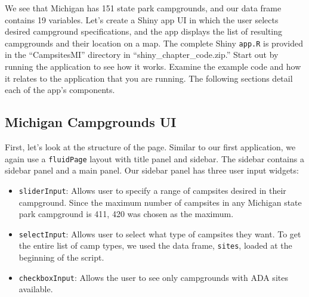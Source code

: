 \documentclass[12pt,oneside]{book}\usepackage[]{graphicx}\usepackage[]{color}
\begin{document}
We see that Michigan has 151 state park campgrounds, and our data frame contains 19 variables. Let's create a Shiny app UI in which the user selects desired campground specifications, and the app displays the list of resulting campgrounds and their location on a map. The complete Shiny \verb+app.R+ is provided in the ``CampsitesMI'' directory in ``shiny\_chapter\_code.zip.'' Start out by running the application to see how it works. Examine the example code and how it relates to the application that you are running. The following sections detail each of the app's components.

\subsection{Michigan Campgrounds UI}

First, let's look at the structure of the page. Similar to our first application, we again use a \verb+fluidPage+ layout with title panel and sidebar. The sidebar contains a sidebar panel and a main panel. Our sidebar panel has three user input widgets:
\begin{itemize}
\item \verb+sliderInput+: Allows user to specify a range of campsites desired in their campground. Since the maximum number of campsites in any Michigan state park campground is 411, 420 was chosen as the maximum.
\item \verb+selectInput+: Allows user to select what type of campsites they want. To get the entire list of camp types, we used the data frame, \verb+sites+, loaded at the beginning of the script.
\item \verb+checkboxInput+: Allows the user to see only campgrounds with ADA sites available.
\end{itemize}
\end{document}
